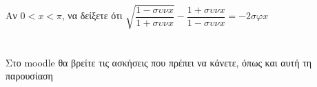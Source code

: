 \documentclass{../presentation}
\begin{document}
\begin{askisi}
  Αν $0<x<π$, να δείξετε ότι $\sqrt{\dfrac{1-συνx}{1+συνx}}-\dfrac{1+συνx}{1-συνx}=-2σφx$
\end{askisi}

\section{}
\begin{frame}
  Στο moodle θα βρείτε τις ασκήσεις που πρέπει να κάνετε, όπως και αυτή τη παρουσίαση
\end{frame}

\end{document}

